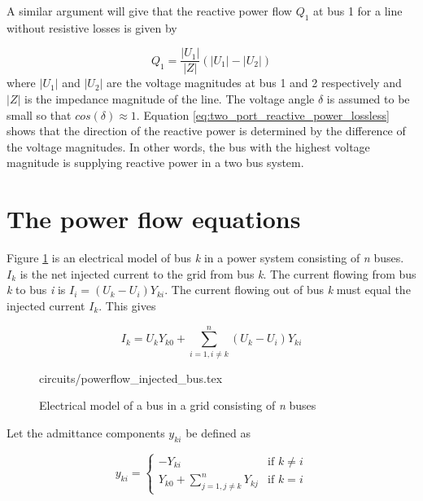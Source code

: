 \documentclass[class=book, crop=false]{standalone}
\begin{document}
A similar argument will give that the reactive power flow $Q_{1}$ at bus 1 for a line without resistive losses is given by 

\begin{equation}\label{eq:two_port_reactive_power_lossless}
Q_{1} =  \frac{|U_{1}|}{|Z|}(|U_{1}| - |U_{2}|)
\end{equation}
where $|U_{1}|$ and $|U_{2}|$ are the voltage magnitudes at bus 1 and 2 respectively and $|Z|$ is the impedance magnitude of the line. The voltage angle $\delta$ is assumed to be small so that $cos(\delta) \approx 1$. Equation \eqref{eq:two_port_reactive_power_lossless} shows that the direction of the reactive power is determined by the difference of the voltage magnitudes. In other words, the bus with the highest voltage magnitude is supplying reactive power in a two bus system.

\section{The power flow equations}
Figure \ref{fig:theory:powerflow_injected_bus} is an electrical model of bus \textit{k} in a power system consisting of \textit{n} buses. $I_{k}$ is the net injected current to the grid from bus \textit{k}\cite{opf_intro}. The current flowing from bus \textit{k} to bus \textit{i} is $I_{i} = (U_{k} - U_{i})Y_{ki}$. The current flowing out of bus \textit{k} must equal the injected current $I_{k}$. This gives

\begin{equation}\label{eq:powerflow_currentsum}
I_{k} =  U_{k}Y_{k0}
+ \sum_{i=1,i\neq k}^{n}(U_{k} - U_{i})Y_{ki}
\end{equation}



\begin{figure}[ht!]
    \center
    {circuits/powerflow_injected_bus.tex}
    \caption[size = 9]{Electrical model of a bus in a grid consisting of \textit{n} buses}
    \label{fig:theory:powerflow_injected_bus}
\end{figure}

Let the admittance components $y_{ki}$ be defined as


\begin{equation}
\label{eq:theory:admittance_components}
    y_{ki} =
\left\{
	\begin{array}{ll}
		     -Y_{ki}  & 
	    \mbox{if }
	        k \neq i
	           \\
		Y_{k0} + \sum_{j=1,j\neq k}^{n} Y_{kj} & \mbox{if } k=i
	\end{array}
\right.
\end{equation}
\end{document}
